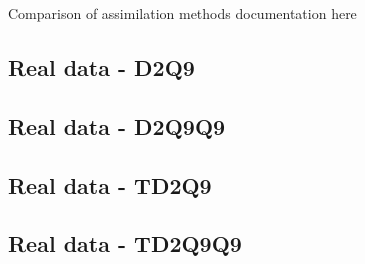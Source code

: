 \documentclass[class=article, crop=false]{standalone}
\begin{document}
Comparison of assimilation methods documentation here

\subsection{Real data - D2Q9}

\subsection{Real data - D2Q9Q9}

\subsection{Real data - TD2Q9}

\subsection{Real data - TD2Q9Q9}
\end{document}

